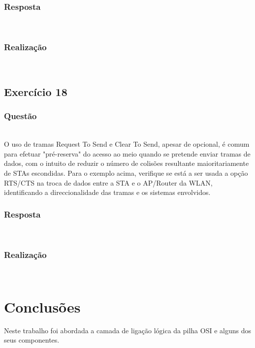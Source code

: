 \documentclass{llncs}
\begin{document}
\subsubsection{Resposta}\rule[-10pt]{0pt}{10pt}\\



\subsubsection{Realização}\rule[-10pt]{0pt}{10pt}\\



\clearpage
\subsection{Exercício 18}
\subsubsection{Questão}\rule[-10pt]{0pt}{10pt}\\

O uso de tramas Request To Send e Clear To Send, apesar de opcional, é comum para efetuar "pré-reserva" do acesso ao meio quando se pretende enviar tramas de dados, com o intuito de reduzir o número de colisões resultante maioritariamente de STAs escondidas. Para o exemplo acima, verifique se está a ser usada a opção RTS/CTS na troca de dados entre a STA e o AP/Router da WLAN, identificando a direccionalidade das tramas e os sistemas envolvidos.

\subsubsection{Resposta}\rule[-10pt]{0pt}{10pt}\\



\subsubsection{Realização}\rule[-10pt]{0pt}{10pt}\\



\clearpage

\section{Conclusões}

\hspace{5mm} Neste trabalho foi abordada a camada de ligação lógica da pilha OSI e alguns dos seus componentes. 
\end{document}
